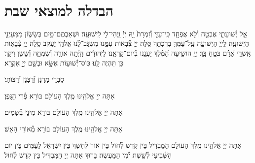 \documentclass[twoside, openany, parskip=half, 11pt]{book}
\begin{document}
\aleinu

\ledavid

\mournerskaddish

\vfill


 \\


\section[הבדלה]{ הבדלה למוצאי שבת } \label{havdala}

אֵ֧ל יְ֯שׁוּעָתִ֛י אֶבְטַ֖ח וְ֯לֹ֣א אֶפְחָ֑ד כִּֽי־עָזִּ֤י וְ֯זִמְרָת֙ יׇ֣הּ יְיָ֔ וַֽיְהִי־לִ֖י לִֽישׁוּעָֽה׃
וּשְׁאַבְתֶּם־מַ֖יִם בְּשָׂשׂ֑וֹן מִמַּעַיְנֵ֖י הַיְשׁוּעָֽה׃
לַֽייָ֥ הַיְשׁוּעָ֑ה עַֽל־עַמְּךָ֖ בִרְכָתֶ֣ךָ סֶּֽלָה׃
יְיָ֣ צְ֯בָא֣וֹת עִמָּ֑נוּ מִשְׂגָּֽב־לָ֨נוּ אֱלֹהֵ֖י יַעֲקֹ֣ב סֶֽלָה׃
יְיָ֥ צְ֯בָא֑וֹת אַֽשְׁרֵ֥י אָ֝דָ֗ם בֹּטֵ֥חַ בָּֽךְ׃
יְיָ֥ הוֹשִׁ֑יעָה הַ֝מֶּ֗לֶךְ יַעֲנֵ֥נוּ בְ֯יוֹם־קׇרְאֵֽנוּ׃
לַיְּהוּדִ֕ים הָֽיְ֯תָ֥ה אוֹרָ֖ה וְ֯שִׂמְחָ֑ה וְ֯שָׂשֹׂ֖ן וִיקָֽר׃ כֵּן תִּהְיֶה לָּֽנוּ׃ כּֽוֹס־יְ֯שׁוּע֥וֹת אֶשָּׂ֑א וּבְשֵׁ֖ם יְיָ֣ אֶקְרָֽא׃

\begin{scriptsize}
סַבְרֵי מָרָנָן וְ֯רַבָּנָן וְ֯רַבּוֹתַי׃ \\
\end{scriptsize}
אַתָּה יְיָ אֱלֹהֵֽינוּ מֶֽלֶךְ הָעוֹלָם בּוֹרֵא פְּ֯רִי הַגָּֽפֶן׃

אַתָּה יְיָ אֱלֹהֵֽינוּ מֶֽלֶךְ הָעוֹלָם בּוֹרֵא מִינֵי בְ֯שָׂמִים׃

אַתָּה יְיָ אֱלֹהֵֽינוּ מֶֽלֶךְ הָעוֹלָם בּוֹרֵא מְ֯אוֹרֵי הָאֵשׁ׃

אַתָּה יְיָ אֱלֹהֵֽינוּ מֶֽלֶךְ הָעוֹלָם הַמַּבְדִיל בֵּין קֹֽדֶשׁ לְ֯חוֹל בֵּין אוֹר לְ֯חֽשֶׁךְ בֵּין יִשְׂרָאֵל לָעַמִּים בֵּין יוֹם הַשְּׁ֯בִיעִי לְ֯שֵֽׁשֶׁת יְ֯מֵי הַמַּעֲשֶׂה׃ בָּרוּךְ אַתָּה יְיָ הַמַּבְדִּיל בֵּין קֹֽדֶשׁ לְ֯חוֹל׃
\clearpage

\vspace{-1.3\baselineskip}
\end{document}
